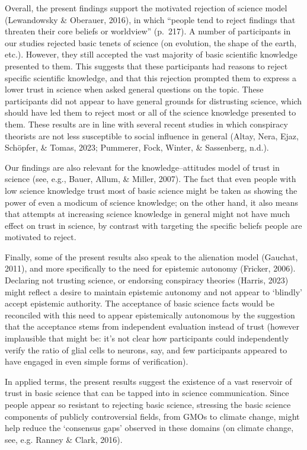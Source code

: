 \documentclass[
  doc,floatsintext]{apa6}
\begin{document}
Overall, the present findings support the motivated rejection of science model (Lewandowsky \& Oberauer, 2016), in which ``people tend to reject findings that threaten their core beliefs or worldview'' (p.~217). A number of participants in our studies rejected basic tenets of science (on evolution, the shape of the earth, etc.). However, they still accepted the vast majority of basic scientific knowledge presented to them. This suggests that these participants had reasons to reject specific scientific knowledge, and that this rejection prompted them to express a lower trust in science when asked general questions on the topic. These participants did not appear to have general grounds for distrusting science, which should have led them to reject most or all of the science knowledge presented to them. These results are in line with several recent studies in which conspiracy theorists are not less susceptible to social influence in general (Altay, Nera, Ejaz, Schöpfer, \& Tomas, 2023; Pummerer, Fock, Winter, \& Sassenberg, n.d.).

Our findings are also relevant for the knowledge--attitudes model of trust in science (see, e.g., Bauer, Allum, \& Miller, 2007). The fact that even people with low science knowledge trust most of basic science might be taken as showing the power of even a modicum of science knowledge; on the other hand, it also means that attempts at increasing science knowledge in general might not have much effect on trust in science, by contrast with targeting the specific beliefs people are motivated to reject.

Finally, some of the present results also speak to the alienation model (Gauchat, 2011), and more specifically to the need for epistemic autonomy (Fricker, 2006). Declaring not trusting science, or endorsing conspiracy theories (Harris, 2023) might reflect a desire to maintain epistemic autonomy and not appear to `blindly' accept epistemic authority. The acceptance of basic science facts would be reconciled with this need to appear epistemically autonomous by the suggestion that the acceptance stems from independent evaluation instead of trust (however implausible that might be: it's not clear how participants could independently verify the ratio of glial cells to neurons, say, and few participants appeared to have engaged in even simple forms of verification).

In applied terms, the present results suggest the existence of a vast reservoir of trust in basic science that can be tapped into in science communication. Since people appear so resistant to rejecting basic science, stressing the basic science components of publicly controversial fields, from GMOs to climate change, might help reduce the `consensus gaps' observed in these domains (on climate change, see, e.g. Ranney \& Clark, 2016).
\end{document}
